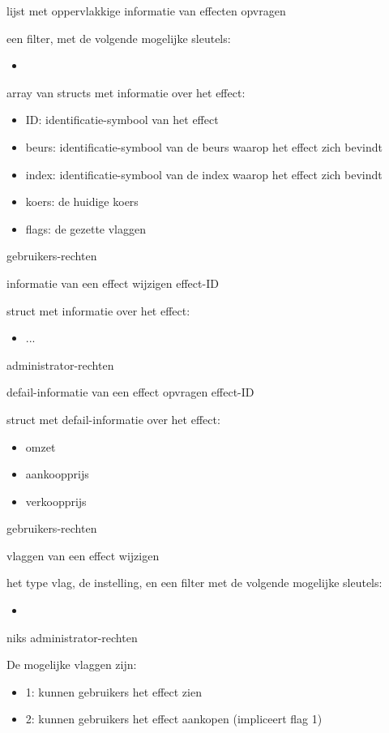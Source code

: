 	{ lijst met oppervlakkige informatie van effecten opvragen }
	{ een filter, met de volgende mogelijke sleutels:
		\begin{itemize}
		\item{}
		\end{itemize} }
	{ array van structs met informatie over het effect:
		\begin{itemize}
		\item{ID: identificatie-symbool van het effect}
		\item{beurs: identificatie-symbool van de beurs waarop het effect zich bevindt}
		\item{index: identificatie-symbool van de index waarop het effect zich bevindt}
		\item{koers: de huidige koers}
		\item{flags: de gezette vlaggen}
		\end{itemize} }
	{ gebruikers-rechten }

	{ informatie van een effect wijzigen }
	{ effect-ID }
	{ struct met informatie over het effect:
		\begin{itemize}
		\item{...}
		\end{itemize} }
	{ administrator-rechten }

	{ defail-informatie van een effect opvragen }
	{ effect-ID }
	{ struct met defail-informatie over het effect:
		\begin{itemize}
		\item{omzet}
		\item{aankoopprijs}
		\item{verkoopprijs}
		\end{itemize} }
	{ gebruikers-rechten }

	{ vlaggen van een effect wijzigen }
	{ het type vlag, de instelling, en een filter met de volgende mogelijke sleutels:
		\begin{itemize}
		\item{}
		\end{itemize} }
	{ niks }
	{ administrator-rechten }

De mogelijke vlaggen zijn:
\begin{itemize}
\item{1: kunnen gebruikers het effect zien}
\item{2: kunnen gebruikers het effect aankopen (impliceert flag 1)}
\end{itemize}
